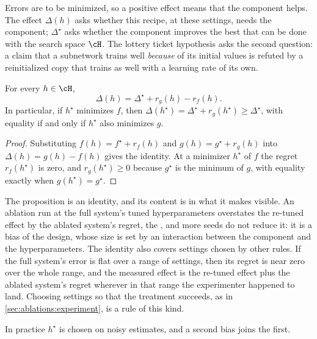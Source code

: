 \begin{refsection}
Errors are to be minimized, so a positive effect means that the component helps. The effect $\Delta(h)$ asks whether this recipe, at these settings, needs the component; $\Delta^\star$ asks whether the component improves the best that can be done with the search space $\cH$. The lottery ticket hypothesis asks the second question: a claim that a subnetwork trains well \emph{because} of its initial values is refuted by a reinitialized copy that trains as well with a learning rate of its own.

\begin{proposition}\label{prop:ablations:homefield}
For every $h\in\cH$,
\[
\Delta(h)=\Delta^\star+r_g(h)-r_f(h).
\]
In particular, if $h^\star$ minimizes $f$, then $\Delta(h^\star)=\Delta^\star+r_g(h^\star)\ge\Delta^\star$, with equality if and only if $h^\star$ also minimizes $g$.
\end{proposition}

\begin{proof}
Substituting $f(h)=f^\star+r_f(h)$ and $g(h)=g^\star+r_g(h)$ into $\Delta(h)=g(h)-f(h)$ gives the identity. At a minimizer $h^\star$ of $f$ the regret $r_f(h^\star)$ is zero, and $r_g(h^\star)\ge0$ because $g^\star$ is the minimum of $g$, with equality exactly when $g(h^\star)=g^\star$.
\end{proof}

The proposition is an identity, and its content is in what it makes visible. An ablation run at the full system's tuned hyperparameters overstates the re-tuned effect by the ablated system's regret, the , and more seeds do not reduce it: it is a bias of the design, whose size is set by an interaction between the component and the hyperparameters. The identity also covers settings chosen by other rules. If the full system's error is flat over a range of settings, then its regret is near zero over the whole range, and the measured effect is the re-tuned effect plus the ablated system's regret wherever in that range the experimenter happened to land. Choosing settings so that the treatment succeeds, as in \cref{sec:ablations:experiment}, is a rule of this kind.

In practice $h^\star$ is chosen on noisy estimates, and a second bias joins the first.


\end{refsection}
